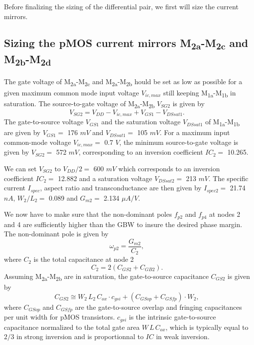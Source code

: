 \documentclass[
  a4paper,
  DIV=11,
  numbers=noendperiod]{scrreprt}
\begin{document}
Before finalizing the sizing of the differential pair, we first will
size the current mirrors.

\subsection{\texorpdfstring{Sizing the pMOS current mirrors
M\textsubscript{2a}-M\textsubscript{2c} and
M\textsubscript{2b}-M\textsubscript{2d}}{Sizing the pMOS current mirrors M2a-M2c and M2b-M2d}}\label{sizing-the-pmos-current-mirrors-m2a-m2c-and-m2b-m2d}

The gate voltage of M\textsubscript{2a}-M\textsubscript{2c} and
M\textsubscript{2a}-M\textsubscript{2b} hould be set as low as possible
for a given maximum common mode input voltage \(V_{ic,max}\) still
keeping M\textsubscript{1a}-M\textsubscript{1b} in saturation. The
source-to-gate voltage of M\textsubscript{2a}-M\textsubscript{2b}
\(V_{SG2}\) is given by \begin{equation}
  V_{SG2} = V_{DD} - V_{ic,max} + V_{GS1} - V_{DSsat1}.
\end{equation} The gate-to-source voltage \(V_{GS1}\) and the saturation
voltage \(V_{DSsat1}\) of M\textsubscript{1a}-M\textsubscript{1b} are
given by \(V_{GS1} =\) 176 \(mV\) and \(V_{DSsat1}  =\) 105 \(mV\). For
a maximum input common-mode voltage \(V_{ic,max} =\) 0.7 \(V\), the
minimum source-to-gate voltage is given by \(V_{SG2} =\) 572 \(mV\),
corresponding to an inversion coefficient \(IC_2 =\) 10.265.

We can set \(V_{SG2}\) to \(V_{DD}/2 =\) 600 \(mV\) which corresponds to
an inversion coefficient \(IC_2 =\) 12.882 and a saturation voltage
\(V_{DSsat2}  =\) 213 \(mV\). The specific current \(I_{spec}\), aspect
ratio and transconductance are then given by \(I_{spec2} =\) 21.74
\(nA\), \(W_2/L_2 =\) 0.089 and \(G_{m2}  =\) 2.134 \(\mu A/V\).

We now have to make sure that the non-dominant poles \(f_{p2}\) and
\(f_{p4}\) at nodes 2 and 4 are sufficiently higher than the GBW to
insure the desired phase margin. The non-dominant pole is given by
\begin{equation}
  \omega_{p2} = \frac{G_{m2}}{C_2},
\end{equation} where \(C_2\) is the total capacitance at node 2
\begin{equation}
 C_2 = 2(C_{GS2} + C_{GB2}).
\end{equation} Assuming M\textsubscript{2a}-M\textsubscript{2b} are in
saturation, the gate-to-source capacitance \(C_{GS2}\) is given by
\begin{equation}
  C_{GS2} \cong W_2\,L_2\,C_{ox} \cdot c_{gsi} + (C_{GSop} + C_{GSfp}) \cdot W_2,
\end{equation} where \(C_{GSop}\) and \(C_{GSfp}\) are the
gate-to-source overlap and fringing capacitances per unit width for pMOS
transistors. \(c_{gsi}\) is the intrinsic gate-to-source capacitance
normalized to the total gate area \(W\,L\,C_{ox}\), which is typically
equal to \(2/3\) in strong inversion and is proportionnal to \(IC\) in
weak inversion.
\end{document}
